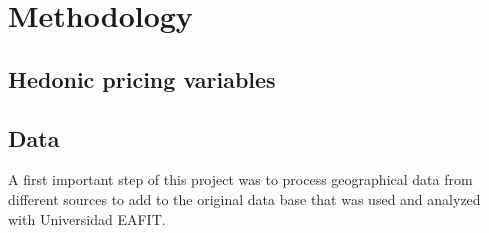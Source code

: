 \documentclass[journal]{IEEEtran}
\begin{document}
\section{Methodology}


\subsection{Hedonic pricing variables}


\begin{table}[htb]
\caption{Common variables in literature.}
\label{1234}
\end{table}


\subsection{Data}

A first important step of this project was to process geographical data from different sources to add to the original data base that was used and analyzed with Universidad EAFIT.
\end{document}

